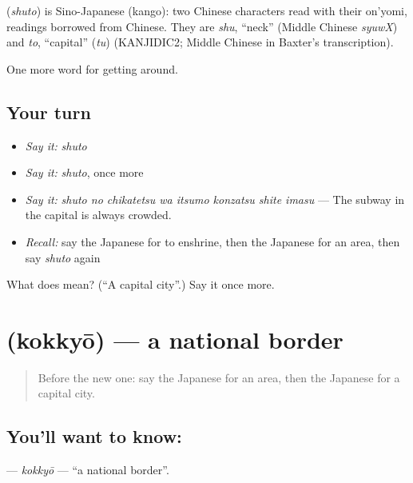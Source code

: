\begin{cousinweb}
\textbf{} (\emph{shuto}) is Sino-Japanese (kango): two Chinese characters read with their on'yomi, readings borrowed from Chinese. They are \emph{shu}, \textquotedblleft{}neck\textquotedblright{} (Middle Chinese \emph{syuwX}) and \emph{to}, \textquotedblleft{}capital\textquotedblright{} (\emph{tu}) (KANJIDIC2; Middle Chinese in Baxter's transcription).
\end{cousinweb}

\begin{grammarlens}[title={What you've built}]
One more word for getting around.
\end{grammarlens}

\subsection*{Your turn}
\begin{itemize}
\raggedright
  \item \emph{Say it:} \emph{shuto}
  \item \emph{Say it:} \emph{shuto}, once more
  \item \emph{Say it:} \emph{shuto no chikatetsu wa itsumo konzatsu shite imasu} — The subway in the capital is always crowded.
  \item \emph{Recall:} say the Japanese for to enshrine, then the Japanese for an area, then say \emph{shuto} again
\end{itemize}

\begin{tcolorbox}[breakable,colback=teal!4,colframe=teal!35!black,title={Before you move on}]
What does  mean? (\textquotedblleft{}A capital city\textquotedblright{}.) Say it once more.
\end{tcolorbox}
\section[\texorpdfstring{\ja{こっきょう} (kokkyō)}{こっきょう (kokkyō)}]{ (kokkyō) — a national border}

\label{lesson:JA-C409-kokkyou}



\begin{quote}
Before the new one: say the Japanese for an area, then the Japanese for a capital city.
\end{quote}

\subsection*{You'll want to know: }
\textbf{} — \emph{kokkyō} — \textquotedblleft{}a national border\textquotedblright{}.

